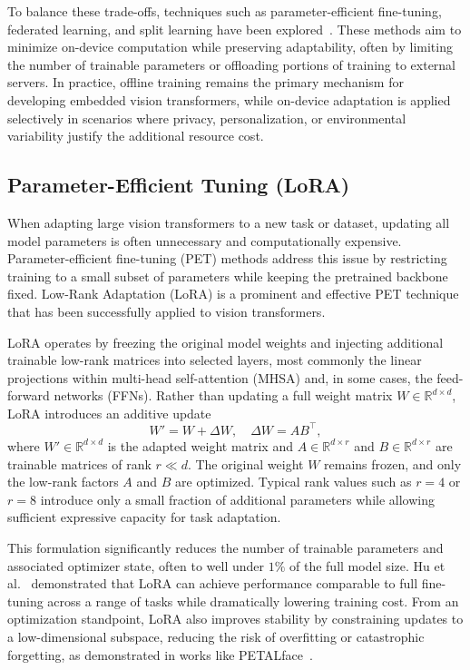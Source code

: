 \documentclass[runningheads,a4paper]{llncs}
\begin{document}
To balance these trade-offs, techniques such as parameter-efficient fine-tuning, federated learning, and split learning have been explored~\cite{houlsby2019adapter,mlsys2023ondevice_chapter}. These methods aim to minimize on-device computation while preserving adaptability, often by limiting the number of trainable parameters or offloading portions of training to external servers. In practice, offline training remains the primary mechanism for developing embedded vision transformers, while on-device adaptation is applied selectively in scenarios where privacy, personalization, or environmental variability justify the additional resource cost.

\subsection{Parameter-Efficient Tuning (LoRA)}
When adapting large vision transformers to a new task or dataset, updating all model parameters is often unnecessary and computationally expensive. Parameter-efficient fine-tuning (PET) methods address this issue by restricting training to a small subset of parameters while keeping the pretrained backbone fixed. Low-Rank Adaptation (LoRA) is a prominent and effective PET technique that has been successfully applied to vision transformers.

LoRA operates by freezing the original model weights and injecting additional trainable low-rank matrices into selected layers, most commonly the linear projections within multi-head self-attention (MHSA) and, in some cases, the feed-forward networks (FFNs). Rather than updating a full weight matrix $W \in \mathbb{R}^{d \times d}$, LoRA introduces an additive update
\[
W' = W + \Delta W, \quad \Delta W = A B^\top,
\]
where $W' \in \mathbb{R}^{d \times d}$ is the adapted weight matrix and $A \in \mathbb{R}^{d \times r}$ and $B \in \mathbb{R}^{d \times r}$ are trainable matrices of rank $r \ll d$. The original weight $W$ remains frozen, and only the low-rank factors $A$ and $B$ are optimized. Typical rank values such as $r=4$ or $r=8$ introduce only a small fraction of additional parameters while allowing sufficient expressive capacity for task adaptation.

This formulation significantly reduces the number of trainable parameters and associated optimizer state, often to well under $1\%$ of the full model size. Hu et al.~\cite{hu2022lora} demonstrated that LoRA can achieve performance comparable to full fine-tuning across a range of tasks while dramatically lowering training cost. From an optimization standpoint, LoRA also improves stability by constraining updates to a low-dimensional subspace, reducing the risk of overfitting or catastrophic forgetting, as demonstrated in works like PETALface~\cite{narayan2025petalface}.
\end{document}
